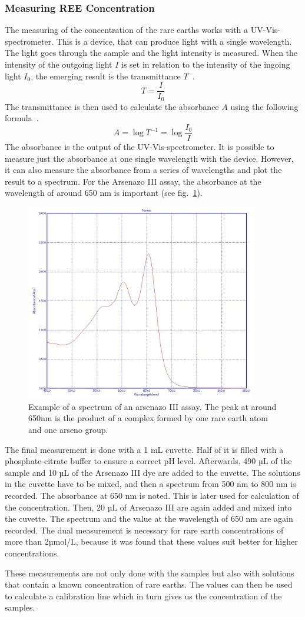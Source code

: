 \subsubsection{Measuring REE Concentration}
The measuring of the concentration of the rare earths works with a UV-Vis-spectrometer.
This is a device, that can produce light with a single wavelength.
The light goes through the sample and the light intensity is measured.
When the intensity of the outgoing light \(I\) is set in relation to the intensity of the ingoing light \(I_0\), the emerging result is the transmittance \(T\)~\cite{transmittanceformula}.
\[T=\frac{I}{I_0}\]
The transmittance is then used to calculate the absorbance \(A\) using the following formula~\cite{arbsorbanceformula}.
\[A=\log{T^{-1}}=\log{\frac{I_0}{I}}\]
The absorbance is the output of the UV-Vis-spectrometer.
It is possible to measure just the absorbance at one single wavelength with the device.
However, it can also measure the absorbance from a series of wavelengths and plot the result to a spectrum.
For the Arsenazo III assay, the absorbance at the wavelength of around 650 nm is important (see fig.~\ref{fig:example_spectrum}).
\begin{figure}[H]
    \centering
    \includegraphics[width=0.9\textwidth]{./media/images/example_spectrum}
    \caption{Example of a spectrum of an arsenazo III assay. The peak at around 650nm is the product of a complex formed by one rare earth atom and one arseno group.}
    \label{fig:example_spectrum}
\end{figure}

The final measurement is done with a 1 mL cuvette.
Half of it is filled with a phosphate-citrate buffer to ensure a correct pH level.
Afterwards, 490 µL of the sample and 10 µL of the Arsenazo III dye are added to the cuvette.
The solutions in the cuvette have to be mixed, and then a spectrum from 500 nm to 800 nm is recorded.
The absorbance at 650 nm is noted.
This is later used for calculation of the concentration.
Then, 20 µL of Arsenazo III are again added and mixed into the cuvette.
The spectrum and the value at the wavelength of 650 nm are again recorded.
The dual measurement is necessary for rare earth concentrations of more than 2µmol/L, because it was found that these values suit better for higher concentrations.

These measurements are not only done with the samples but also with solutions that contain a known concentration of rare earths.
The values can then be used to calculate a calibration line which in turn gives us the concentration of the samples.